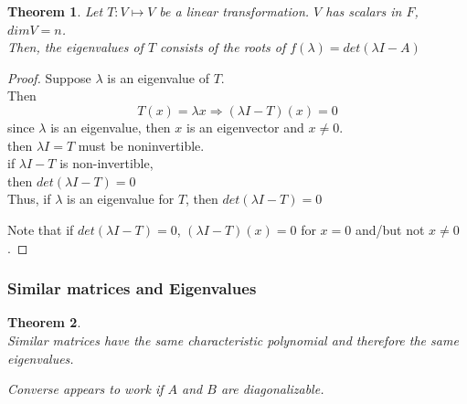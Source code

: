 \documentclass[twoside]{amsart}
\theoremstyle{plain}
\newtheorem{theorem}{Theorem}
\theoremstyle{definition}
\begin{document}
\begin{theorem}
Let $T:V \mapsto V$ be a linear transformation.  $V$ has scalars in $F$, $dim V = n$.  \\
Then, the eigenvalues of $T$ consists of the roots of $f(\lambda) = det(\lambda I -A)$
\end{theorem}

\begin{proof}
Suppose $\lambda$ is an eigenvalue of $T$.  \\
Then 
\[
T(x) = \lambda x  \Longrightarrow (\lambda I - T)(x) = 0 
\]
since $\lambda$ is an eigenvalue, then $x$ is an eigenvector and $x\neq 0$.  \\
then $\lambda I = T$ must be noninvertible.  \\

\phantom{th} if $\lambda I - T $ is non-invertible, \\
\phantom{th if} then $det(\lambda I -T) = 0$ \\

Thus, if $\lambda$ is an eigenvalue for $T$, then $det(\lambda I - T) =0 $

Note that if $det(\lambda I -T)= 0$, $(\lambda I -T)(x) = 0$ for $x=0$ and/but not $x\neq 0$. 
\end{proof}

\subsubsection{Similar matrices and Eigenvalues}

\begin{theorem}\quad \\
Similar matrices have the same characteristic polynomial and therefore the same eigenvalues.

Converse appears to work if $A$ and $B$ are diagonalizable.   
\end{theorem}
\end{document}
